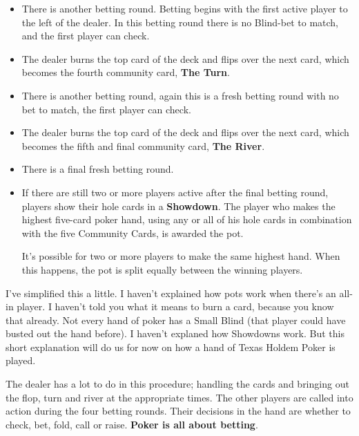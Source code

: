 \begin{itemize}
\item There is another betting round. Betting begins with the first
  active player to the left of the dealer. In this betting round there
  is no Blind-bet to match, and the first player can check.

\item The dealer burns the top card of the deck and flips over the
  next card, which becomes the fourth community card, \textbf{The
    Turn}.

\item There is another betting round, again this is a fresh betting
  round with no bet to match, the first player can check.

\item The dealer burns the top card of the deck and flips over the
  next card, which becomes the fifth and final community card, \textbf{The
    River}.

\item There is a final fresh betting round.

\item If there are still two or more players active after the final
  betting round, players show their hole cards in a \textbf{Showdown}.
  The player who makes the highest five-card poker hand, using any or
  all of his hole cards in combination with the five Community Cards,
  is awarded the pot.

  It's possible for two or more players to make the same highest
  hand. When this happens, the pot is split equally between the
  winning players.

\end{itemize}

I've simplified this a little. I haven't explained how pots work when
there's an all-in player. I haven't told you what it means to burn a
card, because you know that already. Not every hand of poker has
a Small Blind (that player could have busted out the hand before). I
haven't explaned how Showdowns work. But this short explanation will
do us for now on how a hand of Texas Holdem Poker is played.

The dealer has a lot to do in this procedure; handling the cards and
bringing out the flop, turn and river at the appropriate times. The
other players are called into action during the four betting
rounds. Their decisions in the hand are whether to check, bet, fold,
call or raise. \textbf{Poker is all about betting}.
